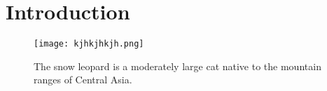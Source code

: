 \documentclass[12pt]{article}
\begin{document}
\listoffigures
\section{Introduction}
\begin{figure}[hb]
\centering
\texttt{[image: kjhkjhkjh.png]}
\caption{The snow leopard is a moderately large cat native to the mountain
ranges of Central
Asia.}
\end{figure}
\end{document}
